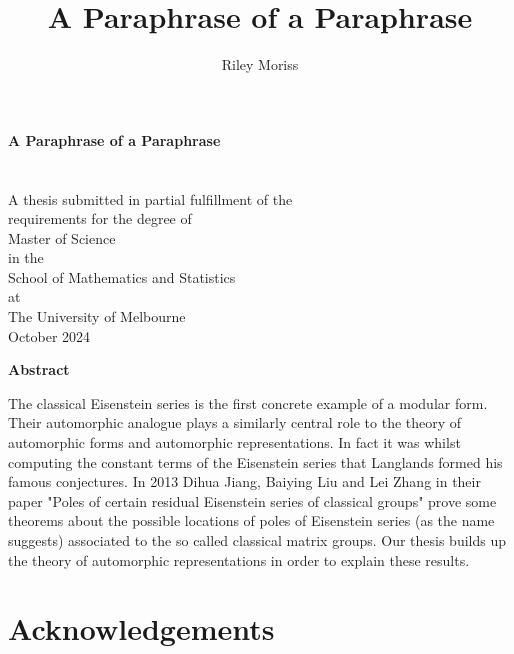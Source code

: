 \documentclass[12pt, openany]{book}
\title{A Paraphrase of a Paraphrase}
\author{Riley Moriss}
\numberwithin{equation}{section}
\begin{document}
    \begin{titlepage}
    \begin{center}
    \vspace*{1cm}
    \huge
    \textbf{A Paraphrase of a Paraphrase}\\
    \vspace{2cm}
    \Large
    \\
    \vspace{0.5cm}
    \\    
 
    A thesis submitted in partial fulfillment of the\\
    requirements for the degree of\\
    Master of Science\\
    in the\\
    School of Mathematics and Statistics\\
    at\\
    The University of Melbourne\\
    \vspace{1,5cm}
    October 2024
\end{center}
\end{titlepage}

\pagebreak





\begin{center}
	\textbf{Abstract}
\end{center}
The classical Eisenstein series is the first concrete example of a modular form. Their automorphic analogue plays a similarly central role to the theory of automorphic forms and automorphic representations. In fact it was whilst computing the constant terms of the Eisenstein series that Langlands formed his famous conjectures. In 2013 Dihua Jiang, Baiying Liu and Lei Zhang in their paper "Poles of certain residual Eisenstein series of classical groups" \cite{jiangPolesCertainResidual2013} prove some theorems about the possible locations of poles of Eisenstein series (as the name suggests) associated to the so called classical matrix groups. Our thesis builds up the theory of automorphic representations in order to explain these results.



\chapter*{Acknowledgements}

\end{document}
